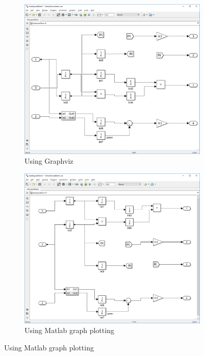 \documentclass{article}
\begin{document}
\begin{figure}[!ht]
	\centering
	 \begin{subfigure}[b]{0.5\textwidth}
	 	\includegraphics[width=\textwidth]{../figs/Demo2_Graphviz}
	 	\caption{Using Graphviz}
	 \end{subfigure}
	 \begin{subfigure}[b]{0.5\textwidth}
	 	\includegraphics[width=\textwidth]{../figs/Demo2_Graphplot}
	 	\caption{Using Matlab graph plotting}
	 \end{subfigure}

\end{figure}
\end{document}
